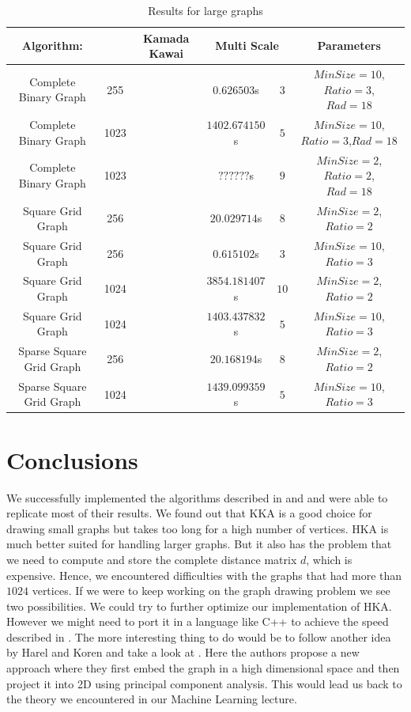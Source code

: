 \documentclass[12pt,a4paper]{article}
\begin{document}
\begin{table}[htb]
\small
\begin{tabular}{|c|c||c|c|c|c|c|}
\hline
Algorithm: & & \multicolumn{2}{|c|}{Kamada Kawai} &  \multicolumn{2}{|c|}{Multi Scale} & Parameters \\
\hline
\hline 
Complete Binary Graph & 255  & & & $0.626503$s    & $3$ & $MinSize=10$, $Ratio=3$, $Rad = 18$\\ 
\hline 
Complete Binary Graph & 1023 & & & $1402.674150$s & $5$ & $MinSize=10$, $Ratio=3$,$Rad = 18$\\ 
\hline 
Complete Binary Graph & 1023 & & & $??????$s & $9$ & $MinSize=2$, $Ratio=2$, $Rad = 18$\\ 
\hline \hline
Square Grid Graph     & 256 & & & $20.029714$s & $8$ & $MinSize=2$, $Ratio=2$\\ 
\hline
Square Grid Graph     & 256 & & & $0.615102$s & $3$ & $MinSize=10$, $Ratio=3$\\ 
\hline
Square Grid Graph     & 1024 & & & $3854.181407$s & $10$ & $MinSize=2$, $Ratio=2$\\ 
\hline
Square Grid Graph     & 1024 & & & $1403.437832$s & $5$ & $MinSize=10$, $Ratio=3$\\ 
\hline\hline
Sparse Square Grid Graph & 256 & & & $20.168194$s & $8$ & $MinSize=2$, $Ratio=2$\\ 
\hline
Sparse Square Grid Graph & 1024 & & & $1439.099359$s & $5$ & $MinSize=10$, $Ratio=3$\\ 
\hline 

\end{tabular} 
\caption{Results for large graphs}
\label{table: large}
\end{table}

\FloatBarrier 

\section{Conclusions}

We successfully implemented the algorithms described in \cite{TomihisaKamada1989} and \cite{DavidHarel2002} and were able to replicate most of their results. We found out that KKA is a good choice for drawing small graphs but takes too long for a high number of vertices. HKA is much better suited for handling larger graphs. But it also has the problem that we need to compute and store the complete distance matrix $d$, which is expensive. Hence, we encountered difficulties with the graphs that had more than $1024$ vertices. If we were to keep working on the graph drawing problem we see two possibilities. We could try to further optimize our implementation of HKA. However we might need to port it in a language like C++ to achieve the speed described in \cite{DavidHarel2002}. The more interesting thing to do would be to follow another idea by Harel and Koren and take a look at \cite{Harel2004}. Here the authors propose a new approach where they first embed the graph in a high dimensional space and then project it into 2D using principal component analysis. This would lead us back to the theory we encountered in our Machine Learning lecture.  





\end{document}
